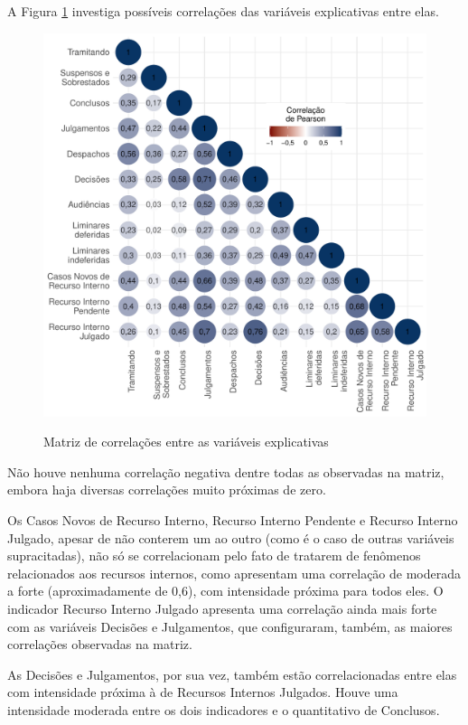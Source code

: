 A Figura \ref{fig:corr_matrix} investiga possíveis correlações das variáveis explicativas entre elas. 
\begin{figure}[H]
    \centering
    \caption{Matriz de correlações entre as variáveis explicativas}
    \includegraphics[scale=0.8]{imagens/corrplot.pdf}
    \label{fig:corr_matrix}
\end{figure}

Não houve nenhuma correlação negativa dentre todas as observadas na matriz, embora haja diversas correlações muito próximas de zero.

Os Casos Novos de Recurso Interno, Recurso Interno Pendente e Recurso Interno Julgado, apesar de não conterem um ao outro (como é o caso de outras variáveis supracitadas), não só se correlacionam pelo fato de tratarem de fenômenos relacionados aos recursos internos, como apresentam uma correlação de moderada a forte (aproximadamente de 0,6), com intensidade próxima para todos eles. O indicador Recurso Interno Julgado apresenta uma correlação ainda mais forte com as variáveis Decisões e Julgamentos, que configuraram, também, as maiores correlações observadas na matriz.

As Decisões e Julgamentos, por sua vez, também estão correlacionadas entre elas com intensidade próxima à de Recursos Internos Julgados. Houve uma intensidade moderada entre os dois indicadores e o quantitativo de Conclusos.

